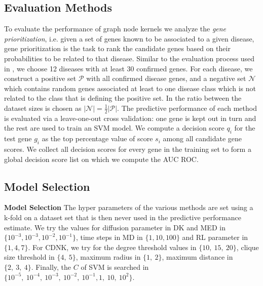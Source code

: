\documentclass{article}
\begin{document}
\subsection{Evaluation Methods}
To evaluate the performance of graph node kernels we analyze the {\em gene prioritization}, i.e. given a set of genes known to be associated to a given disease, gene prioritization is the task to rank the candidate genes based on their probabilities to be related to that disease. Similar to the evaluation process used in \cite{medk}, we choose 12 diseases with at least 30 confirmed genes. For each disease, we construct a positive set $\mathcal{P}$ with all confirmed disease genes, and a negative set $\mathcal{N}$ which contains random genes associated at least to one disease class which is not related to the class that is defining the positive set. In \cite{medk} the ratio between the dataset sizes is chosen as $\vert \mathcal{N} \vert = \frac{1}{2} \vert \mathcal{P} \vert$. The predictive performance of each method is evaluated via a leave-one-out cross validation: one gene is kept out in turn and the rest are used to train an SVM model. We compute a decision score $q_i$ for the test gene $g_i$ as the top percentage value of score $s_i$ among all candidate gene scores. We collect all decision scores for every gene in the training set to form a global decision score list on which we compute the AUC ROC.
\subsection{Model Selection}
\textbf{Model Selection}
The hyper parameters of the various methods are set using a k-fold on a dataset set that is then never used in the predictive performance estimate. We try the values for diffusion parameter in DK and MED in $\lbrace 10^{-3}, 10^{-3}, 10^{-2}, 10^{-1} \rbrace$, time steps in MD in $\lbrace 1, 10, 100 \rbrace$ and RL parameter in $\lbrace 1, 4, 7 \rbrace$. For CDNK, we try for the degree threshold values in $\lbrace 10,\ 15,\ 20 \rbrace$, clique size threshold in $\lbrace 4,\ 5 \rbrace$, maximum radius in $\lbrace 1,\ 2 \rbrace$, maximum distance in $\lbrace 2,\ 3,\ 4 \rbrace$. Finally, the $C$ of SVM is searched in $\lbrace 10^{-5},  \ 10^{-4}, \ 10^{-3},\ 10^{-2},\ 10^{-1}, 1,\ 10,\ 10^2 \rbrace$.
\end{document}
